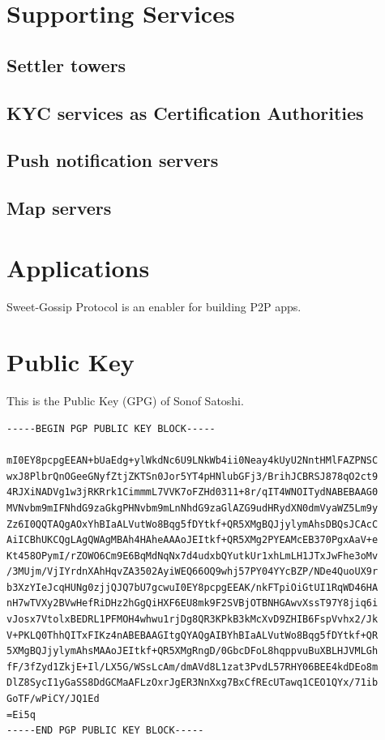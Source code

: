 \documentclass{article}
\begin{document}
\section{Supporting Services}

\subsection{Settler towers}

\subsection{KYC services as Certification Authorities}

\subsection{Push notification servers}

\subsection{Map servers}

\section{Applications}

Sweet-Gossip Protocol is an enabler for building P2P apps.


\section{Public Key}
This is the Public Key (GPG) of Sonof Satoshi.
\label{gpgkey}
\begin{small}
\begin{verbatim}
-----BEGIN PGP PUBLIC KEY BLOCK-----

mI0EY8pcpgEEAN+bUaEdg+ylWkdNc6U9LNkWb4ii0Neay4kUyU2NntHMlFAZPNSC
wxJ8PlbrQnOGeeGNyfZtjZKTSn0Jor5YT4pHNlubGFj3/BrihJCBRSJ878qO2ct9
4RJXiNADVg1w3jRKRrk1CimmmL7VVK7oFZHd0311+8r/qIT4WNOITydNABEBAAG0
MVNvbm9mIFNhdG9zaGkgPHNvbm9mLnNhdG9zaGlAZG9udHRydXN0dmVyaWZ5Lm9y
Zz6I0QQTAQgAOxYhBIaALVutWo8Bqg5fDYtkf+QR5XMgBQJjylymAhsDBQsJCAcC
AiICBhUKCQgLAgQWAgMBAh4HAheAAAoJEItkf+QR5XMg2PYEAMcEB370PgxAaV+e
Kt458OPymI/rZOWO6Cm9E6BqMdNqNx7d4udxbQYutkUr1xhLmLH1JTxJwFhe3oMv
/3MUjm/VjIYrdnXAhHqvZA3502AyiWEQ66OQ9whj57PY04YYcBZP/NDe4QuoUX9r
b3XzYIeJcqHUNg0zjjQJQ7bU7gcwuI0EY8pcpgEEAK/nkFTpiOiGtUI1RqWD46HA
nH7wTVXy2BVwHefRiDHz2hGgQiHXF6EU8mk9F2SVBjOTBNHGAwvXssT97Y8jiq6i
vJosx7VtolxBEDRL1PFMOH4whwu1rjDg8QR3KPkB3kMcXvD9ZHIB6FspVvhx2/Jk
V+PKLQ0ThhQITxFIKz4nABEBAAGItgQYAQgAIBYhBIaALVutWo8Bqg5fDYtkf+QR
5XMgBQJjylymAhsMAAoJEItkf+QR5XMgRngD/0GbcDFoL8hqppvuBuXBLHJVMLGh
fF/3fZyd1ZkjE+Il/LX5G/WSsLcAm/dmAVd8L1zat3PvdL57RHY06BEE4kdDEo8m
DlZ8SycI1yGaSS8DdGCMaAFLzOxrJgER3NnXxg7BxCfREcUTawq1CEO1QYx/71ib
GoTF/wPiCY/JQ1Ed
=Ei5q
-----END PGP PUBLIC KEY BLOCK-----
\end{verbatim}
\end{small}



  
\end{document}
